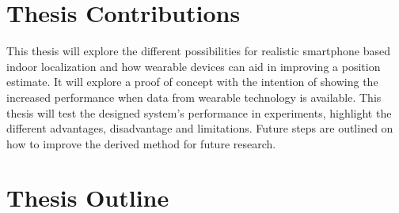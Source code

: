 \section{Thesis Contributions}
This thesis will explore the different possibilities for realistic smartphone based indoor localization and how wearable devices can aid in improving a position estimate. It will explore a proof of concept with the intention of showing the increased performance when data from wearable technology is available. This thesis will test the designed system's performance in experiments, highlight the different advantages, disadvantage and limitations. Future steps are outlined on how to improve the derived method for future research.

\section{Thesis Outline}